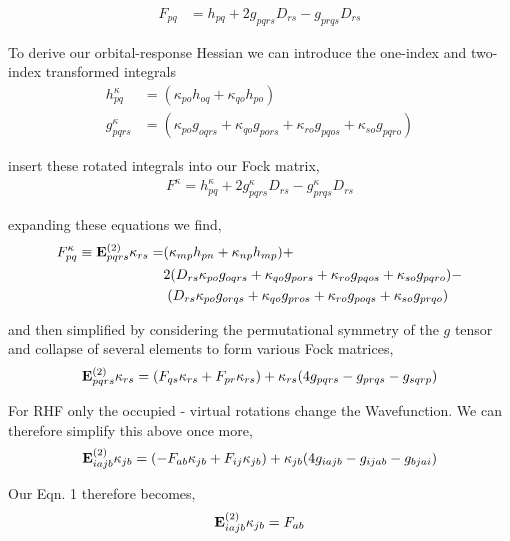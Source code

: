 \documentclass[aip,jcp,preprint,superscriptaddress,floatfix]{revtex4-1}
\begin{document}
\begin{align}
{F}_{pq} &= h_{pq} + 2 g_{pqrs} D_{rs} - g_{prqs} D_{rs}
\end{align}

To derive our orbital-response Hessian we can introduce the one-index and two-index transformed integrals
\begin{align}
h^{\kappa}_{pq} &=  (\kappa_{po}h_{oq} + \kappa_{qo}h_{po})\\
g^{\kappa}_{pqrs} &= (\kappa_{po}g_{oqrs} + \kappa_{qo}g_{pors} +\kappa_{ro}g_{pqos} + \kappa_{so}g_{pqro})
\end{align}

insert these rotated integrals into our Fock matrix,
\begin{align}
F^\kappa = h^\kappa_{pq} + 2 g^\kappa_{pqrs} D_{rs} - g^\kappa_{prqs} D_{rs}
\end{align}

expanding these equations we find,
\begin{align}
F^\kappa_{pq} \equiv {\rm\bf E}^{(2)}_{pqrs}\kappa_{rs}  =& (\kappa_{mp}h_{pn} + \kappa_{np}h_{mp}) + \notag\\
& 2( D_{rs}\kappa_{po} g_{oqrs} + \kappa_{qo} g_{pors} + \kappa_{ro} g_{pqos} + \kappa_{so} g_{pqro}) -\notag\\
&\;(D_{rs} \kappa_{po} g_{orqs} + \kappa_{qo} g_{pros} + \kappa_{ro} g_{poqs} + \kappa_{so} g_{prqo})
\end{align}

and then simplified by considering the permutational symmetry of the $g$ tensor and collapse of several elements to form various Fock matrices,
\begin{eqnarray}
{\rm\bf E}^{(2)}_{pqrs}\kappa_{rs} = ({F}_{qs}\kappa_{rs} + {F}_{pr}\kappa_{rs}) + \kappa_{rs}(4 g_{pqrs} - g_{prqs} - g_{sqrp})
\end{eqnarray}

For RHF only the occupied - virtual rotations change the Wavefunction. We can therefore simplify this above once more,
\begin{eqnarray}
{\rm\bf E}^{(2)}_{iajb}\kappa_{jb} = (-{F}_{ab}\kappa_{jb} + {F}_{ij}\kappa_{jb}) + \kappa_{jb}(4 g_{iajb} - g_{ijab} - g_{bjai})
\end{eqnarray}

Our Eqn. 1 therefore becomes,
\begin{eqnarray}
\label{final_soscf}
{\rm\bf E}^{(2)}_{iajb}\kappa_{jb} = F_{ab}
\end{eqnarray}
\end{document}
